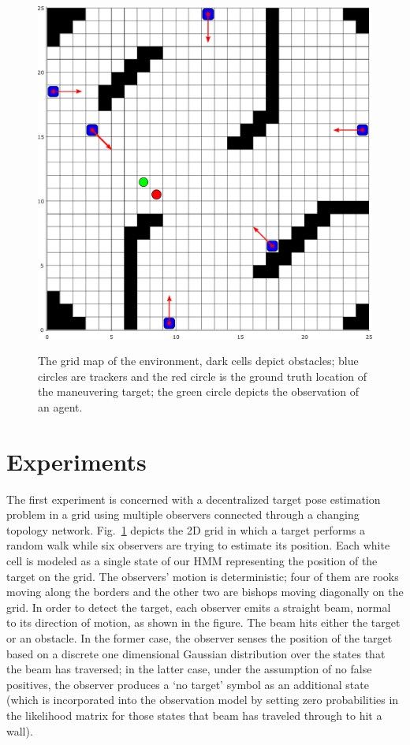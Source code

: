 \documentclass[conference]{IEEEtran}
\theoremstyle{remark}
\begin{document}
\begin{figure}[t]
	\centering
	{\includegraphics[width=.85\columnwidth]{./figs/exp1_Corrected2.pdf}}
	\caption{ The grid map of the environment, dark cells depict obstacles; 
	blue circles are trackers and the red circle is the ground truth location 
	of the maneuvering target; the green circle depicts the observation of 
	an agent.}
	\label{fig:exp1}
\end{figure}

\section{Experiments} \label{sec:experiments}
The first experiment is concerned with a decentralized target pose estimation 
problem in a grid using multiple observers  connected through a changing  
topology network. Fig.~\ref{fig:exp1} depicts the 2D grid in which a target 
performs a random walk while six observers are trying to estimate its position. 
Each white cell is modeled as a single state of our HMM representing the 
position of the target on the grid. The observers' motion is deterministic; 
four of them are rooks moving along the borders and the other two are bishops 
moving diagonally on the grid. In order to detect the target, each observer 
emits a straight beam, normal to its direction of motion, as shown in the 
figure. The beam hits either the target or an obstacle. In the former case, the 
observer senses the position of the target 
based on a discrete one dimensional Gaussian distribution over the states that 
the beam has traversed; in the latter case, under the assumption of no false 
positives, the observer produces a `no target' symbol as an additional 
state (which is incorporated into the observation model by setting zero 
probabilities in 
the likelihood matrix for those states that beam has traveled through to hit 
a wall). 
\end{document}
